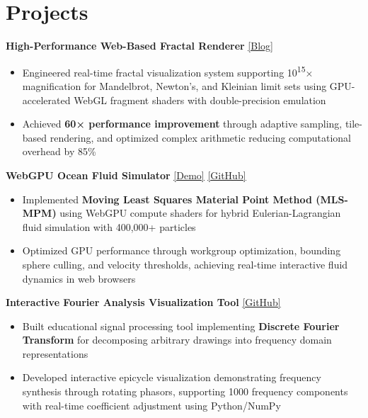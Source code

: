 \documentclass[11pt]{article}
\begin{document}
\section*{\textcolor{modernblue}{\Large Projects}}
\textbf{High-Performance Web-Based Fractal Renderer} \href{https://dimitrichrysafis.github.io/#post/post6.md}{\underline{[Blog]}}
\begin{itemize}[leftmargin=*, topsep=1pt, itemsep=1pt, parsep=0pt]
\item Engineered real-time fractal visualization system supporting 10\textsuperscript{15}× magnification for Mandelbrot, Newton's, and Kleinian limit sets using GPU-accelerated WebGL fragment shaders with double-precision emulation
\item Achieved \textbf{60× performance improvement} through adaptive sampling, tile-based rendering, and optimized complex arithmetic reducing computational overhead by 85\%
\end{itemize}

\vspace{3pt}
\noindent\textbf{WebGPU Ocean Fluid Simulator} \href{https://dimitrichrysafis.github.io/media/misc/fluidemo/index.html}{\underline{[Demo]}} \href{https://github.com/DimitriChrysafis/3d-Volumetric-Fluid-Simulator-From-Scratch}{\underline{[GitHub]}}
\begin{itemize}[leftmargin=*, topsep=1pt, itemsep=1pt, parsep=0pt]
\item Implemented \textbf{Moving Least Squares Material Point Method (MLS-MPM)} using WebGPU compute shaders for hybrid Eulerian-Lagrangian fluid simulation with 400,000+ particles
\item Optimized GPU performance through workgroup optimization, bounding sphere culling, and velocity thresholds, achieving real-time interactive fluid dynamics in web browsers
\end{itemize}

\vspace{3pt}
\noindent\textbf{Interactive Fourier Analysis Visualization Tool} \href{https://github.com/DimitriChrysafis/FourierDrawer}{\underline{[GitHub]}}
\begin{itemize}[leftmargin=*, topsep=1pt, itemsep=1pt, parsep=0pt]
\item Built educational signal processing tool implementing \textbf{Discrete Fourier Transform} for decomposing arbitrary drawings into frequency domain representations
\item Developed interactive epicycle visualization demonstrating frequency synthesis through rotating phasors, supporting 1000 frequency components with real-time coefficient adjustment using Python/NumPy
\end{itemize}
\end{document}
